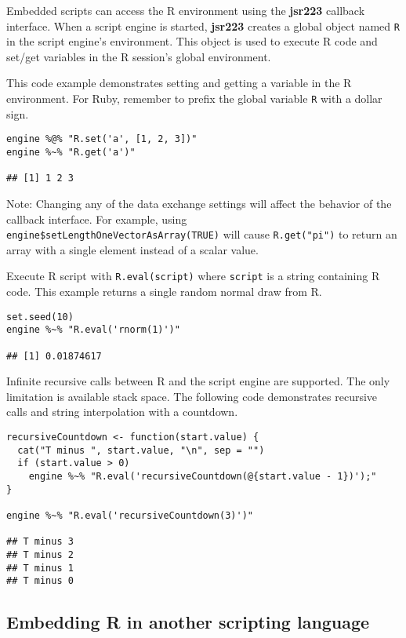 \documentclass[
article,
11pt, %
a4paper, %
oneside, %
headinclude,footinclude, %
]{scrartcl}
\theoremstyle{definition} %
\theoremstyle{plain} %
\theoremstyle{remark} %
\newcommand{\pkg}[1]{\textbf{#1}}
\newcommand{\code}[1]{\texttt{#1}}
\newcommand{\strong}[1]{\texorpdfstring{{\normalfont\fontseries{b}\selectfont #1}}{#1}}
\begin{document}
Embedded scripts can access the R environment using the \pkg{jsr223} callback interface. When a script engine is started, \pkg{jsr223} creates a global object named \code{R} in the script engine's environment. This object is used to execute R code and set/get variables in the R session's global environment.

This code example demonstrates setting and getting a variable in the R environment. For Ruby, remember to prefix the global variable \code{R} with a dollar sign.

\begin{verbatim}
engine %@% "R.set('a', [1, 2, 3])"
engine %~% "R.get('a')"

## [1] 1 2 3
\end{verbatim}

\strong{Note:} Changing any of the data exchange settings will affect the behavior of the callback interface. For example, using \code{engine\$setLengthOneVectorAsArray(TRUE)} will cause \code{R.get("pi")} to return an array with a single element instead of a scalar value.

Execute R script with \code{R.eval(script)} where \code{script} is a string containing R code. This example returns a single random normal draw from R.

\begin{verbatim}
set.seed(10)
engine %~% "R.eval('rnorm(1)')"

## [1] 0.01874617
\end{verbatim}

Infinite recursive calls between R and the script engine are supported. The only limitation is available stack space. The following code demonstrates recursive calls and string interpolation with a countdown.

\begin{verbatim}
recursiveCountdown <- function(start.value) {
  cat("T minus ", start.value, "\n", sep = "")
  if (start.value > 0)
    engine %~% "R.eval('recursiveCountdown(@{start.value - 1})');"
}

engine %~% "R.eval('recursiveCountdown(3)')"

## T minus 3
## T minus 2
## T minus 1
## T minus 0
\end{verbatim}

\subsection{Embedding R in another scripting language}
\end{document}
